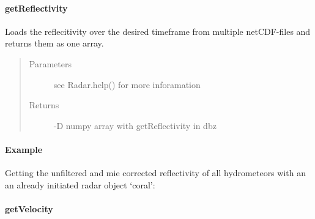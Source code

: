 \documentclass[letterpaper,10pt,english]{sphinxmanual}
\begin{document}
\begin{fulllineitems}
\begin{fulllineitems}
\end{fulllineitems}



\paragraph{getReflectivity}
\label{\detokenize{generated/MPPy.Instruments.Radar.Radar.getReflectivity::doc}}\label{\detokenize{generated/MPPy.Instruments.Radar.Radar.getReflectivity:getreflectivity}}

\begin{fulllineitems}
\label{\detokenize{generated/MPPy.Instruments.Radar.Radar.getReflectivity:MPPy.Instruments.Radar.Radar.getReflectivity}}
Loads the reflecitivity over the desired timeframe from multiple netCDF-files and returns them as one array.
\begin{quote}\begin{description}
\item[{Parameters}] \leavevmode
{} \textendash{} see Radar.help() for more inforamation

\item[{Returns}] -D numpy array with getReflectivity in dbz

\end{description}\end{quote}
\paragraph{Example}

Getting the unfiltered and mie corrected reflectivity of all hydrometeors with an an already
initiated radar object ‘coral’:

\begin{sphinxVerbatim}[commandchars=\\\{\}]
\end{sphinxVerbatim}

\end{fulllineitems}



\paragraph{getVelocity}
\label{\detokenize{generated/MPPy.Instruments.Radar.Radar.getVelocity::doc}}\label{\detokenize{generated/MPPy.Instruments.Radar.Radar.getVelocity:getvelocity}}


\end{fulllineitems}
\end{document}

